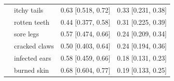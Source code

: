 \documentclass[10pt,letterpaper]{article}
\begin{document}
\begin{table}[h]
\begin{tabular}{| l || l | l | l |}
       & itchy tails        & 0.63 {[}0.518, 0.72{]} & 0.33 {[}0.231, 0.38{]} \\
       & rotten teeth       & 0.44 {[}0.377, 0.58{]} & 0.31 {[}0.225, 0.39{]} \\
       & sore legs          & 0.57 {[}0.474, 0.66{]} & 0.24 {[}0.209, 0.34{]} \\
       & cracked claws      & 0.50 {[}0.403, 0.64{]} & 0.24 {[}0.194, 0.36{]} \\
       & infected ears      & 0.58 {[}0.459, 0.66{]} & 0.18 {[}0.131, 0.23{]} \\
       & burned skin        & 0.68 {[}0.604, 0.77{]} & 0.19 {[}0.133, 0.25{]} \\
       \hline
\end{tabular}
\end{table}    
    
\end{document}
